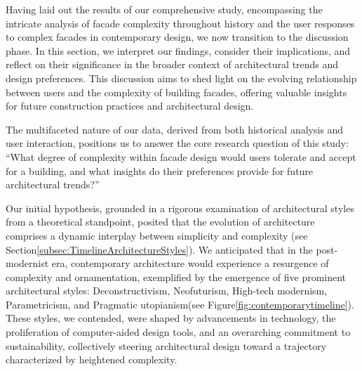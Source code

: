 


Having laid out the results of our comprehensive study, encompassing the intricate analysis of facade complexity throughout history and the user responses to complex facades in contemporary design, we now transition to the discussion phase.
In this section, we interpret our findings, consider their implications, and reflect on their significance in the broader context of architectural trends and design preferences.
This discussion aims to shed light on the evolving relationship between users and the complexity of building facades, offering valuable insights for future construction practices and architectural design.

The multifaceted nature of our data, derived from both historical analysis and user interaction, positions us to answer the core research question of this study: ``What degree of complexity within facade design would users tolerate and accept for a building, and what insights do their preferences provide for future architectural trends?''



Our initial hypothesis, grounded in a rigorous examination of architectural styles from a theoretical standpoint, posited that the evolution of architecture comprises a dynamic interplay between simplicity and complexity (see Section\ref{subsec:TimelineArchitectureStyles}).
We anticipated that in the post-modernist era, contemporary architecture would experience a resurgence of complexity and ornamentation, exemplified by the emergence of five prominent architectural styles: Deconstructivism, Neofuturism, High-tech modernism, Parametricism, and Pragmatic utopianism(see Figure\ref{fig:contemporarytimeline}).
These styles, we contended, were shaped by advancements in technology, the proliferation of computer-aided design tools, and an overarching commitment to sustainability, collectively steering architectural design toward a trajectory characterized by heightened complexity.

